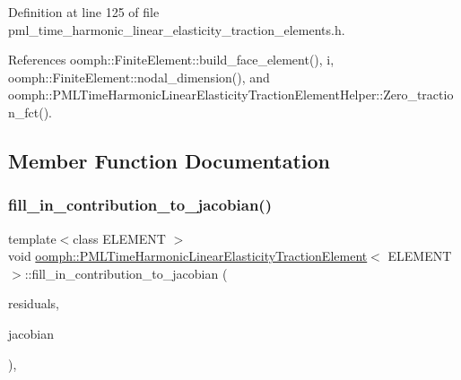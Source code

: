 Definition at line 125 of file pml\+\_\+time\+\_\+harmonic\+\_\+linear\+\_\+elasticity\+\_\+traction\+\_\+elements.\+h.



References oomph\+::\+Finite\+Element\+::build\+\_\+face\+\_\+element(), i, oomph\+::\+Finite\+Element\+::nodal\+\_\+dimension(), and oomph\+::\+P\+M\+L\+Time\+Harmonic\+Linear\+Elasticity\+Traction\+Element\+Helper\+::\+Zero\+\_\+traction\+\_\+fct().



\subsection{Member Function Documentation}
\mbox{\label{classoomph_1_1PMLTimeHarmonicLinearElasticityTractionElement_abde183ce1fbe5c0d8ce199978a972394}} 
\subsubsection{\texorpdfstring{fill\+\_\+in\+\_\+contribution\+\_\+to\+\_\+jacobian()}{fill\_in\_contribution\_to\_jacobian()}}
{\footnotesize\ttfamily template$<$class E\+L\+E\+M\+E\+NT $>$ \\
void \hyperlink{classoomph_1_1PMLTimeHarmonicLinearElasticityTractionElement}{oomph\+::\+P\+M\+L\+Time\+Harmonic\+Linear\+Elasticity\+Traction\+Element}$<$ E\+L\+E\+M\+E\+NT $>$\+::fill\+\_\+in\+\_\+contribution\+\_\+to\+\_\+jacobian (\begin{DoxyParamCaption}\item[{\hyperlink{classoomph_1_1Vector}{Vector}$<$ double $>$ \&}]{residuals,  }\item[{\hyperlink{classoomph_1_1DenseMatrix}{Dense\+Matrix}$<$ double $>$ \&}]{jacobian }\end{DoxyParamCaption})\hspace{0.3cm}{\ttfamily [inline]}, {\ttfamily [virtual]}}



